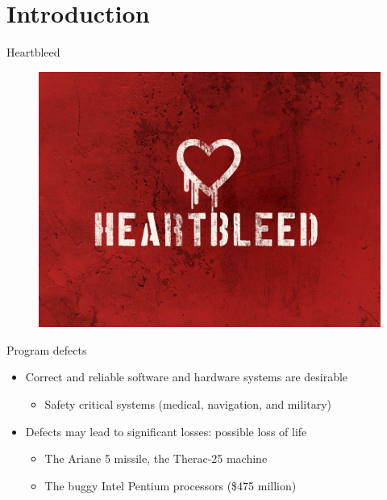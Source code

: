 
\section{Introduction}

\begin{frame}{Heartbleed}
\begin{figure}
 \centering
 \includegraphics[scale=0.4]{figures/heartbleed}
\end{figure}
\end{frame}

\begin{frame}{Program defects }
  \begin{itemize}
  \item
    Correct and reliable software and hardware systems are desirable
  \begin{itemize}
   \item Safety critical systems (medical, navigation, and military)
  \end{itemize}
  \item
	Defects may lead to significant losses: possible loss of life
  \begin{itemize}
   \item 
    The Ariane 5 missile, the Therac-25 machine~\cite{ammann2008introduction}
   \item
    The buggy Intel Pentium processors  (\$475 million)~\cite{kropf1999introduction}
  \end{itemize}
  \end{itemize}
\end{frame}

